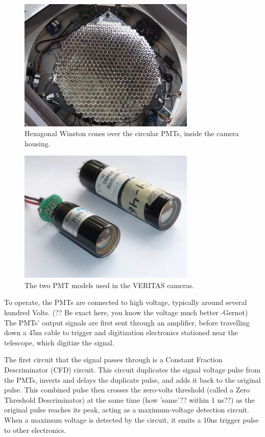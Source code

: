 \begin{figure}[ht]
  \centering
  \includegraphics[width=0.75\textwidth]{images/winston_cones_t2}
  \caption[Winston Cones]{
    Hexagonal Winston cones over the circular PMTs, inside the camera housing.}
  \label{fig:winstcones}
\end{figure}


\begin{figure}[ht]
  \centering
  \includegraphics[width=0.75\textwidth]{images/pmt_models}
  \caption[PMT Models]{
    The two PMT models used in the VERITAS cameras.\cite{pmtmodels}}
  \label{fig:pmtmodels}
\end{figure}

To operate, the PMTs are connected to high voltage, typically around several hundred Volts.
{\color{red}(?? Be exact here, you know the voltage much better -Gernot)}
The PMTs' output signals are first sent through an amplifier, before travelling down a \nicetilde45m cable to trigger and digitization electronics stationed near the telescope, which digitize the signal.

The first circuit that the signal passes through is a Constant Fraction Descriminator (CFD) circuit.
This circuit duplicates the signal voltage pulse from the PMTs, inverts and delays the duplicate pulse, and adds it back to the original pulse.
This combined pulse then crosses the zero-volts threshold (called a Zero Threshold Descriminator) at the same time {\color{red}(how 'same'?? within 1 ns??)} as the original pulse reaches its peak, acting as a maximum-voltage detection circuit.
When a maximum voltage is detected by the circuit, it emits a 10ns trigger pulse to other electronics.

